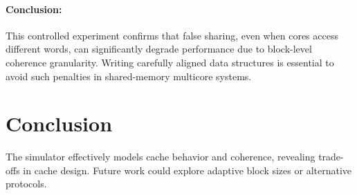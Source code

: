 \documentclass{article}
\begin{document}
\paragraph{Conclusion:}
This controlled experiment confirms that false sharing, even when cores access different words, can significantly degrade performance due to block-level coherence granularity. Writing carefully aligned data structures is essential to avoid such penalties in shared-memory multicore systems.


\section{Conclusion}

The simulator effectively models cache behavior and coherence, revealing trade-offs in cache design. Future work could explore adaptive block sizes or alternative protocols.
\end{document}
